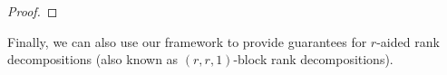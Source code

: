 \documentclass[11pt]{article}
\theoremstyle{definition}
\newcommand{\ceil}[1]{\lceil #1 \rceil}
\newcommand{\floor}[1]{\lfloor #1 \rfloor}
\newcommand{\setft}[1]{\mathrm{#1}}
\newcommand{\field}{\mathbb{F}}
\newcommand\X{\mathcal{X}}
\newcommand\A{\mathcal{A}}
\newcommand\B{\mathcal{B}}
\newcommand\V{\mathcal{V}}
\def\ba#1\ea{\begin{align}#1\end{align}}
\begin{document}
\begin{proof}
%
%
%
%
\end{proof}



Finally, we can also use our framework to provide guarantees for $r$-aided rank decompositions (also known as $(r,r,1)$-block rank decompositions).
\end{document}
